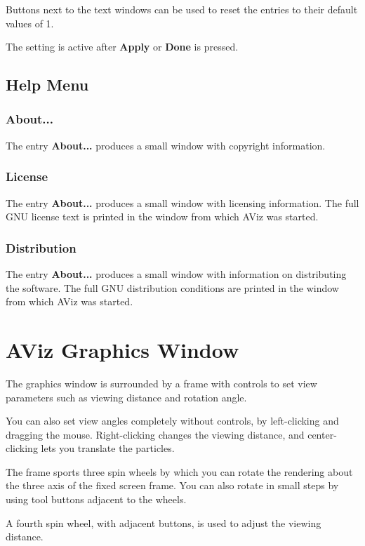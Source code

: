 \documentclass[11pt]{article}
\begin{document}
Buttons next to the text windows can be used to reset the entries
to their default values of 1.

The setting is active after {\bf Apply} or {\bf Done} is pressed.

\subsection{Help Menu}

\subsubsection{About...}

The entry {\bf About...} produces a small window with copyright information.

\subsubsection{License}

The entry {\bf About...} produces a small window with licensing information.
The full GNU license text is printed in the window from which AViz was started.

\subsubsection{Distribution}

The entry {\bf About...} produces a small window with information on 
distributing the software.  The full GNU distribution conditions are 
printed in the window from which AViz was started.

\section{AViz Graphics Window}

The graphics window is surrounded by a frame with controls to set view 
parameters such as viewing distance and rotation angle.  

You can also set view angles completely without controls, by left-clicking
and dragging the mouse.  Right-clicking changes the viewing distance, and 
center-clicking lets you translate the particles.

The frame sports three spin wheels by which you can rotate the rendering about 
the three axis of the fixed screen frame.  You can also rotate in small 
steps by using tool buttons adjacent to the wheels. 

A fourth spin wheel, with adjacent buttons, is used to adjust the viewing
distance.
\end{document}
